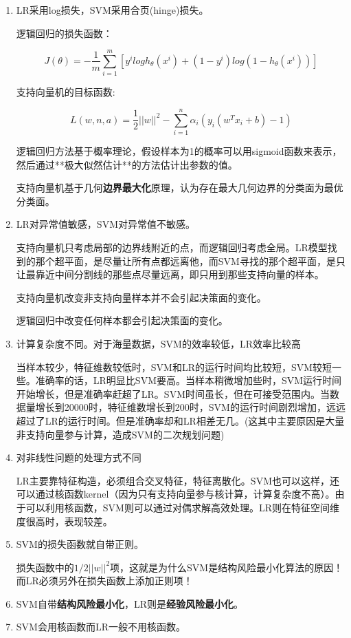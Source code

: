 \begin{enumerate}\itemsep0em 
		\item LR采用log损失，SVM采用合页(hinge)损失。

			逻辑回归的损失函数：

		$$
		J(\theta)=-\frac{1}{m}\sum^m_{i=1}\left[y^{i}logh_{\theta}(x^{i})+ (1-y^{i})log(1-h_{\theta}(x^{i}))\right]
		$$

		支持向量机的目标函数:

		$$
		L(w,n,a)=\frac{1}{2}||w||^2-\sum^n_{i=1}\alpha_i \left( y_i(w^Tx_i+b)-1\right)
		$$

		逻辑回归方法基于概率理论，假设样本为1的概率可以用sigmoid函数来表示，然后通过**极大似然估计**的方法估计出参数的值。  

		支持向量机基于几何{\bf 边界最大化}原理，认为存在最大几何边界的分类面为最优分类面。

	\item LR对异常值敏感，SVM对异常值不敏感。

		支持向量机只考虑局部的边界线附近的点，而逻辑回归考虑全局。LR模型找到的那个超平面，是尽量让所有点都远离他，而SVM寻找的那个超平面，是只让最靠近中间分割线的那些点尽量远离，即只用到那些支持向量的样本。  

		支持向量机改变非支持向量样本并不会引起决策面的变化。  

		逻辑回归中改变任何样本都会引起决策面的变化。  

	\item 计算复杂度不同。对于海量数据，SVM的效率较低，LR效率比较高

		当样本较少，特征维数较低时，SVM和LR的运行时间均比较短，SVM较短一些。准确率的话，LR明显比SVM要高。当样本稍微增加些时，SVM运行时间开始增长，但是准确率赶超了LR。SVM时间虽长，但在可接受范围内。当数据量增长到20000时，特征维数增长到200时，SVM的运行时间剧烈增加，远远超过了LR的运行时间。但是准确率却和LR相差无几。(这其中主要原因是大量非支持向量参与计算，造成SVM的二次规划问题)

	\item 对非线性问题的处理方式不同

		LR主要靠特征构造，必须组合交叉特征，特征离散化。SVM也可以这样，还可以通过核函数kernel（因为只有支持向量参与核计算，计算复杂度不高）。由于可以利用核函数，SVM则可以通过对偶求解高效处理。LR则在特征空间维度很高时，表现较差。

	\item SVM的损失函数就自带正则。

		损失函数中的$1/2||w||^2$项，这就是为什么SVM是结构风险最小化算法的原因！而LR必须另外在损失函数上添加正则项！

	\item SVM自带{\bf 结构风险最小化}，LR则是{\bf 经验风险最小化}。

	\item SVM会用核函数而LR一般不用核函数。

\end{enumerate}

